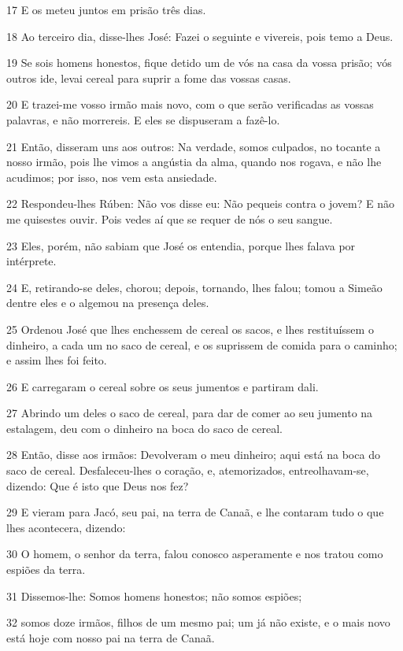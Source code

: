 \par 17 E os meteu juntos em prisão três dias.
\par 18 Ao terceiro dia, disse-lhes José: Fazei o seguinte e vivereis, pois temo a Deus.
\par 19 Se sois homens honestos, fique detido um de vós na casa da vossa prisão; vós outros ide, levai cereal para suprir a fome das vossas casas.
\par 20 E trazei-me vosso irmão mais novo, com o que serão verificadas as vossas palavras, e não morrereis. E eles se dispuseram a fazê-lo.
\par 21 Então, disseram uns aos outros: Na verdade, somos culpados, no tocante a nosso irmão, pois lhe vimos a angústia da alma, quando nos rogava, e não lhe acudimos; por isso, nos vem esta ansiedade.
\par 22 Respondeu-lhes Rúben: Não vos disse eu: Não pequeis contra o jovem? E não me quisestes ouvir. Pois vedes aí que se requer de nós o seu sangue.
\par 23 Eles, porém, não sabiam que José os entendia, porque lhes falava por intérprete.
\par 24 E, retirando-se deles, chorou; depois, tornando, lhes falou; tomou a Simeão dentre eles e o algemou na presença deles.
\par 25 Ordenou José que lhes enchessem de cereal os sacos, e lhes restituíssem o dinheiro, a cada um no saco de cereal, e os suprissem de comida para o caminho; e assim lhes foi feito.
\par 26 E carregaram o cereal sobre os seus jumentos e partiram dali.
\par 27 Abrindo um deles o saco de cereal, para dar de comer ao seu jumento na estalagem, deu com o dinheiro na boca do saco de cereal.
\par 28 Então, disse aos irmãos: Devolveram o meu dinheiro; aqui está na boca do saco de cereal. Desfaleceu-lhes o coração, e, atemorizados, entreolhavam-se, dizendo: Que é isto que Deus nos fez?
\par 29 E vieram para Jacó, seu pai, na terra de Canaã, e lhe contaram tudo o que lhes acontecera, dizendo:
\par 30 O homem, o senhor da terra, falou conosco asperamente e nos tratou como espiões da terra.
\par 31 Dissemos-lhe: Somos homens honestos; não somos espiões;
\par 32 somos doze irmãos, filhos de um mesmo pai; um já não existe, e o mais novo está hoje com nosso pai na terra de Canaã.
